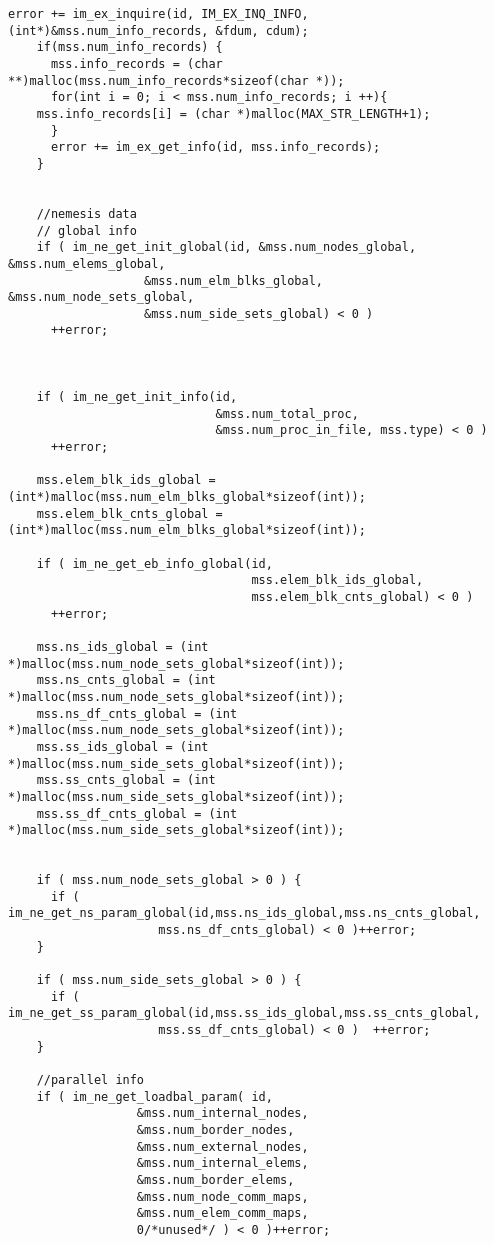\begin{Verbatim}[fontsize=\small]
    error += im_ex_inquire(id, IM_EX_INQ_INFO, (int*)&mss.num_info_records, &fdum, cdum);
    if(mss.num_info_records) { 
      mss.info_records = (char **)malloc(mss.num_info_records*sizeof(char *));
      for(int i = 0; i < mss.num_info_records; i ++){
	mss.info_records[i] = (char *)malloc(MAX_STR_LENGTH+1);
      }
      error += im_ex_get_info(id, mss.info_records);
    }


    //nemesis data
    // global info
    if ( im_ne_get_init_global(id, &mss.num_nodes_global, &mss.num_elems_global,
			       &mss.num_elm_blks_global, &mss.num_node_sets_global,
			       &mss.num_side_sets_global) < 0 )
      ++error;

  

    if ( im_ne_get_init_info(id, 
                             &mss.num_total_proc, 
                             &mss.num_proc_in_file, mss.type) < 0 )
      ++error;

    mss.elem_blk_ids_global = (int*)malloc(mss.num_elm_blks_global*sizeof(int));
    mss.elem_blk_cnts_global = (int*)malloc(mss.num_elm_blks_global*sizeof(int));

    if ( im_ne_get_eb_info_global(id,
                                  mss.elem_blk_ids_global,
                                  mss.elem_blk_cnts_global) < 0 )
      ++error;

    mss.ns_ids_global = (int *)malloc(mss.num_node_sets_global*sizeof(int));
    mss.ns_cnts_global = (int *)malloc(mss.num_node_sets_global*sizeof(int));
    mss.ns_df_cnts_global = (int *)malloc(mss.num_node_sets_global*sizeof(int));
    mss.ss_ids_global = (int *)malloc(mss.num_side_sets_global*sizeof(int));
    mss.ss_cnts_global = (int *)malloc(mss.num_side_sets_global*sizeof(int));
    mss.ss_df_cnts_global = (int *)malloc(mss.num_side_sets_global*sizeof(int));

    
    if ( mss.num_node_sets_global > 0 ) {
      if ( im_ne_get_ns_param_global(id,mss.ns_ids_global,mss.ns_cnts_global,
				     mss.ns_df_cnts_global) < 0 )++error;
    }
    
    if ( mss.num_side_sets_global > 0 ) {
      if ( im_ne_get_ss_param_global(id,mss.ss_ids_global,mss.ss_cnts_global,
				     mss.ss_df_cnts_global) < 0 )  ++error;      
    }
    
    //parallel info
    if ( im_ne_get_loadbal_param( id, 
				  &mss.num_internal_nodes,
				  &mss.num_border_nodes, 
				  &mss.num_external_nodes,
				  &mss.num_internal_elems, 
				  &mss.num_border_elems,
				  &mss.num_node_comm_maps,
				  &mss.num_elem_comm_maps,
				  0/*unused*/ ) < 0 )++error;
    

\end{Verbatim}
